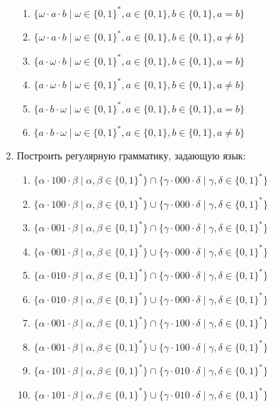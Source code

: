 \documentclass[12pt]{article}
\begin{document}
\begin{enumerate}
\begin{enumerate}[label=\arabic*)]
    \item $\{ \omega \cdot a \cdot b \mid \omega \in \{0, 1\}^*, a \in \{0, 1\}, b \in \{0, 1\}, a = b \}$
    \item $\{ \omega \cdot a \cdot b \mid \omega \in \{0, 1\}^*, a \in \{0, 1\}, b \in \{0, 1\}, a \neq b \}$
    \item $\{ a \cdot \omega \cdot b \mid \omega \in \{0, 1\}^*, a \in \{0, 1\}, b \in \{0, 1\}, a = b \}$
    \item $\{ a \cdot \omega \cdot b \mid \omega \in \{0, 1\}^*, a \in \{0, 1\}, b \in \{0, 1\}, a \neq b \}$
    \item $\{ a \cdot b \cdot \omega \mid \omega \in \{0, 1\}^*, a \in \{0, 1\}, b \in \{0, 1\}, a = b \}$
    \item $\{ a \cdot b \cdot \omega \mid \omega \in \{0, 1\}^*, a \in \{0, 1\}, b \in \{0, 1\}, a \neq b \}$

  \end{enumerate}

  \item Построить регулярную грамматику, задающую язык:
  \begin{enumerate}[label=\arabic*)]
    \setlength\itemsep{0.8em}

    \item $\{ \alpha \cdot 100 \cdot \beta \mid \alpha, \beta \in \{0, 1\}^*\} \cap \{\gamma \cdot 000 \cdot \delta \mid \gamma, \delta \in \{0, 1\}^* \}$
    \item $\{ \alpha \cdot 100 \cdot \beta \mid \alpha, \beta \in \{0, 1\}^*\} \cup \{\gamma \cdot 000 \cdot \delta \mid \gamma, \delta \in \{0, 1\}^* \}$
    \item $\{ \alpha \cdot 001 \cdot \beta \mid \alpha, \beta \in \{0, 1\}^*\} \cap \{\gamma \cdot 000 \cdot \delta \mid \gamma, \delta \in \{0, 1\}^* \}$
    \item $\{ \alpha \cdot 001 \cdot \beta \mid \alpha, \beta \in \{0, 1\}^*\} \cup \{\gamma \cdot 000 \cdot \delta \mid \gamma, \delta \in \{0, 1\}^* \}$
    \item $\{ \alpha \cdot 010 \cdot \beta \mid \alpha, \beta \in \{0, 1\}^*\} \cap \{\gamma \cdot 000 \cdot \delta \mid \gamma, \delta \in \{0, 1\}^* \}$
    \item $\{ \alpha \cdot 010 \cdot \beta \mid \alpha, \beta \in \{0, 1\}^*\} \cup \{\gamma \cdot 000 \cdot \delta \mid \gamma, \delta \in \{0, 1\}^* \}$
    \item $\{ \alpha \cdot 001 \cdot \beta \mid \alpha, \beta \in \{0, 1\}^*\} \cap \{\gamma \cdot 100 \cdot \delta \mid \gamma, \delta \in \{0, 1\}^* \}$
    \item $\{ \alpha \cdot 001 \cdot \beta \mid \alpha, \beta \in \{0, 1\}^*\} \cup \{\gamma \cdot 100 \cdot \delta \mid \gamma, \delta \in \{0, 1\}^* \}$
    \item $\{ \alpha \cdot 101 \cdot \beta \mid \alpha, \beta \in \{0, 1\}^*\} \cap \{\gamma \cdot 010 \cdot \delta \mid \gamma, \delta \in \{0, 1\}^* \}$
    \item $\{ \alpha \cdot 101 \cdot \beta \mid \alpha, \beta \in \{0, 1\}^*\} \cup \{\gamma \cdot 010 \cdot \delta \mid \gamma, \delta \in \{0, 1\}^* \}$


\end{enumerate}
\end{enumerate}
\end{document}
